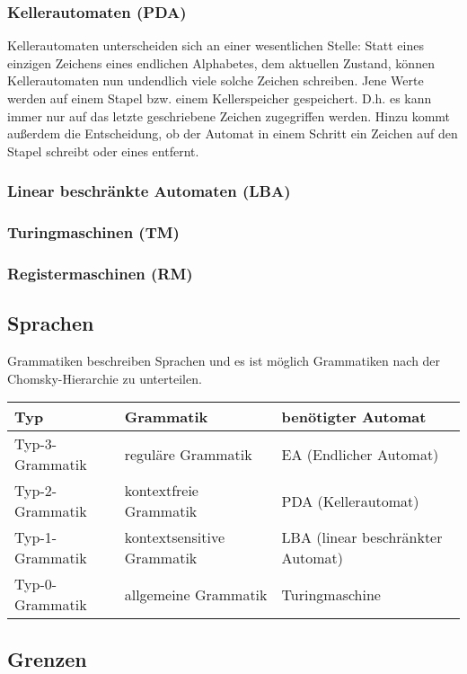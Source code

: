 \documentclass{article}
\begin{document}
\subsubsection{Kellerautomaten (PDA)}
Kellerautomaten unterscheiden sich an einer wesentlichen Stelle: Statt eines einzigen Zeichens eines endlichen Alphabetes, dem aktuellen Zustand, können Kellerautomaten nun undendlich viele solche Zeichen schreiben. Jene Werte werden auf einem Stapel bzw. einem Kellerspeicher gespeichert. D.h. es kann immer nur auf das letzte geschriebene Zeichen zugegriffen werden. Hinzu kommt außerdem die Entscheidung, ob der Automat in einem Schritt ein Zeichen auf den Stapel schreibt oder eines entfernt.
\subsubsection{Linear beschränkte Automaten (LBA)}

\subsubsection{Turingmaschinen (TM)}
\subsubsection{Registermaschinen (RM)}
\subsection{Sprachen}
Grammatiken beschreiben Sprachen und es ist möglich Grammatiken nach der Chomsky-Hierarchie zu unterteilen.\\
\begin{tabular}{l | l | l}
    Typ         & Grammatik       &  benötigter Automat               \\\hline
    Typ-3-Grammatik     & reguläre Grammatik            & EA (Endlicher Automat)            \\
    Typ-2-Grammatik     & kontextfreie Grammatik        & PDA (Kellerautomat)               \\
    Typ-1-Grammatik     & kontextsensitive Grammatik    & LBA (linear beschränkter Automat) \\
    Typ-0-Grammatik     & allgemeine Grammatik          & Turingmaschine          \\
\end{tabular}
\subsection{Grenzen}
\end{document}
